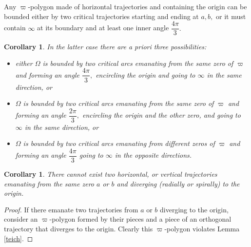 \documentclass[12pt]{amsart}
\newtheorem{corollary}[theorem]{Corollary}
\begin{document}
Any $\varpi $-polygon made of horizontal trajectories and containing the
origin can be bounded either by two critical trajectories starting and
ending at $a,b,$ or it must contain $\infty $ at its boundary and at least
one inner angle $\dfrac{4\pi }{3}.$

\begin{corollary}
\label{1coroll teich}In the latter case there are a priori three
possibilities:

\begin{itemize}
\item either $\Omega $ is bounded by two critical arcs emanating from the
same zero of $\varpi $ and forming an angle $\dfrac{4\pi }{3},$ encircling
the origin and going to $\infty $ in the same direction, or

\item $\Omega $ is bounded by two critical arcs emanating from the same zero
of $\varpi $ and forming an angle $\dfrac{2\pi }{3},$ encircling the origin
and the other zero, and going to $\infty $ in the same direction, or

\item $\Omega $ is bounded by two critical arcs emanating from different
zeros of $\varpi $ and forming an angle $\dfrac{4\pi }{3}$ going to $\infty $
in the opposite directions.
\end{itemize}
\end{corollary}

\begin{corollary}
\label{2spirals1zero}There cannot exist two horizontal, or vertical
trajectories emanating from the same zero $a$ or $b$ and diverging (radially
or spirally) to the origin.
\end{corollary}

\begin{proof}
If there emanate two trajectories from $a$ or $b$ diverging to the origin,
consider an $\varpi $-polygon formed by their pieces and a piece of an
orthogonal trajectory that diverges to the origin. Clearly this $\varpi $-polygon violates Lemma \ref{teich}.
\end{proof}
\end{document}
